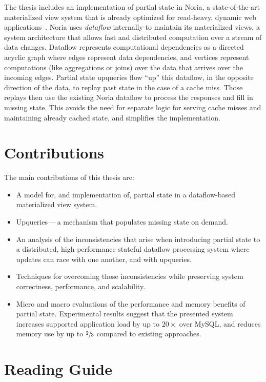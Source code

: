 The thesis includes an implementation of partial state in Noria, a
state-of-the-art materialized view system that is already optimized for
read-heavy, dynamic web applications~\cite{noria}. Noria uses \textit{dataflow}
internally to maintain its materialized views, a system architecture that allows
fast and distributed computation over a stream of data changes. Dataflow
represents computational dependencies as a directed acyclic graph where edges
represent data dependencies, and vertices represent computations (like
aggregations or joins) over the data that arrives over the incoming edges.
Partial state upqueries flow ``up'' this dataflow, in the opposite direction of
the data, to replay past state in the case of a cache miss. Those replays then
use the existing Noria dataflow to process the responses and fill in missing
state. This avoids the need for separate logic for serving cache misses and
maintaining already cached state, and simplifies the implementation.

\section{Contributions}
\label{s:contrib}

The main contributions of this thesis are:

\begin{itemize}
 \item A model for, and implementation of, partial state in a dataflow-based
   materialized view system.
 \item Upqueries\,---\,a mechanism that populates missing state on demand.
 \item An analysis of the inconsistencies that arise when introducing partial
   state to a distributed, high-performance stateful dataflow processing system
    where updates can race with one another, and with upqueries.
 \item Techniques for overcoming those inconsistencies while preserving system
   correctness, performance, and scalability.
 \item Micro and macro evaluations of the performance and memory benefits of
   partial state. Experimental results suggest that the presented system
    increases supported application load by up to $20\times$ over MySQL, and
    reduces memory use by up to $\sfrac{2}{3}$ compared to existing approaches.
\end{itemize}

\section{Reading Guide}
\label{s:read}

